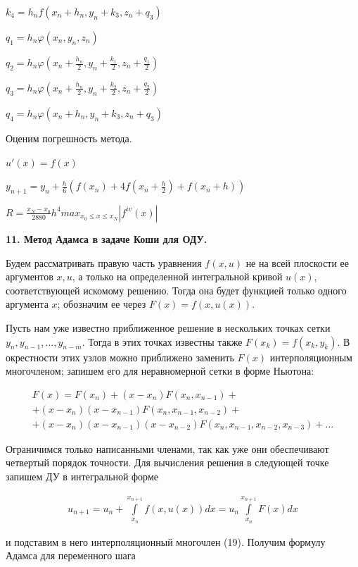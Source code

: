 \documentclass[a4paper,14pt]{article}
\begin{document}
$k_4 = h_n f(x_n + h_n, y_n + k_3, z_n + q_3)$

$q_1 = h_n \varphi(x_n, y_n, z_n)$

$q_2 = h_n \varphi(x_n + \frac{h_n}{2}, y_n + \frac{k_1}{2}, z_n + \frac{q_1}{2})$

$q_3 = h_n \varphi(x_n + \frac{h_n}{2}, y_n + \frac{k_2}{2}, z_n + \frac{q_2}{2})$

$q_4 = h_n \varphi(x_n + h_n, y_n + k_3, z_n + q_3)$

Оценим погрешность метода.

$u'(x) = f(x)$

$y_{n+1} = y_n + \frac{h}{6} \left( f(x_n) + 4 f(x_n + \frac{h}{2}) + f(x_n + h) \right)$

$R = \frac{x_N - x_0}{2880} h^4 max_{x_0 \leq x \leq x_N} |f^{iv}(x)|$

\textbf{11. Метод Адамса в задаче Коши для ОДУ.}

Будем рассматривать правую часть уравнения $f(x, u)$ не на всей
плоскости ее аргументов $x, u$, а только на определенной интегральной
кривой $u(x)$, соответствующей искомому решению. Тогда она
будет функцией только одного аргумента $x$; обозначим ее через 
$F(x) = f(x, u(x))$.

Пусть нам уже известно приближенное решение в нескольких точках
сетки $y_n, y_{n-1}, ..., y_{n-m}$. Тогда в этих точках известны также
$F(x_k) = f(x_k, y_k)$. В окрестности этих узлов можно приближено
заменить $F(x)$ интерполяционным многочленом; запишем его
для неравномерной сетки в форме Ньютона:

\begin{eqnarray}
	F(x) = F(x_n) + (x - x_n) F(x_n, x_{n-1}) + \nonumber \\
	+ (x - x_n) (x - x_{n-1})F(x_n, x_{n-1}, x_{n-2}) + \nonumber \\
	+ (x - x_n) (x - x_{n-1}) (x - x_{n-2}) F(x_n, x_{n-1}, x_{n-2}, x_{n-3}) + ...
\end{eqnarray}

Ограничимся только написанными членами, так как уже они обеспечивают
четвертый порядок точности. Для вычисления решения в следующей точке запишем
ДУ в интегральной форме

\begin{eqnarray}
	u_{n+1} = u_n + \int\limits_{x_{n}}^{x_{n+1}} f(x, u(x)) dx = u_n \int\limits_{x_{n}}^{x_{n+1}} F(x) dx
\end{eqnarray}

и подставим в него интерполяционный многочлен (19). Получим формулу
Адамса для переменного шага
\end{document}
